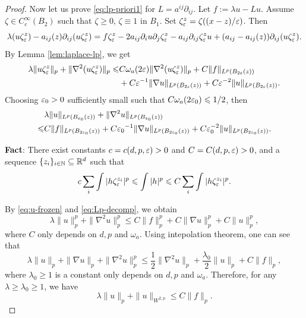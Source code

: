 \begin{proof}
    Now let us prove \eqref{eq:lp-priori1} for \(L=a^{ij}\partial_{ij}\). Let $f:=\lambda u-L u$. Assume $\zeta\in C_c^\infty(B_2)$ such that $\zeta\geq 0$, $\zeta\equiv1$ in $B_1$. Set $\zeta_\varepsilon^z=\zeta((x-z)/\varepsilon)$. Then
    \begin{equation*}
        \lambda (u\zeta_\varepsilon^z) - a_{ij}(z)\partial_{ij}(u\zeta_\varepsilon^z) =  f\zeta_\varepsilon^z-2a_{ij}\partial_i u\partial_{j}\zeta_\varepsilon^z -a_{ij}\partial_{ij}\zeta_\varepsilon^z u +(a_{ij}-a_{ij}(z)) \partial_{ij}(u\zeta_\varepsilon^z).
    \end{equation*}
    By Lemma \ref{lem:laplace-lp},  we get 
		\begin{equation*}
			\begin{aligned}
				\lambda \|u \zeta_\varepsilon^z\|_p+ \|\nabla^2(u\zeta_\varepsilon^z)\|_{p} \leqslant & C \omega_a(2\varepsilon) \|\nabla^2 (u\zeta_\varepsilon^z)\|_p+ C \|f\|_{L^p(B_{2\varepsilon}(z))}\\
				&+C \varepsilon^{-1} \|\nabla u \|_{L^p(B_{2\varepsilon}(z))}+ C\varepsilon^{-2} \|u\|_{L^p(B_{2\varepsilon}(z))}. 
			\end{aligned}
		\end{equation*}
		Choosing $\varepsilon_0>0$ sufficiently small such that $C\omega_a(2\varepsilon_0)\leqslant 1/2$, then 
		\begin{equation}\label{eq:u-frozen}
			\begin{aligned}
				&\lambda \|u\|_{L^p(B_{\varepsilon_0}(z))} + \|\nabla^2 u\|_{L^p(B_{\varepsilon_0}(z))} \\
				\leqslant& C \|f\|_{L^p(B_{2{\varepsilon_0}}(z))}+C {\varepsilon_0}^{-1} \|\nabla u \|_{L^p(B_{2{\varepsilon_0}}(z))}+ C\varepsilon_0^{-2} \|u\|_{L^p(B_{2{\varepsilon_0}}(z))}. 
			\end{aligned}
		\end{equation}
		\begin{framed}
		    {\bf Fact}: There exist constants $c=c(d,  p, \varepsilon)>0$ and $C=C(d,  p, \varepsilon)>0$, and a sequence $\{z_i \}_{i\in {\mathbb N}}\subseteq {\mathbb R}^d$ such that 
		    \begin{equation}\label{eq:Lp-decomp}
			    c \sum_{i} \int |h\zeta_\varepsilon^{z_i}|^p   \leqslant \int |h|^p \leqslant C \sum_{i} \int |h\zeta_\varepsilon^{z_i}|^p. 
		    \end{equation}
		\end{framed}
		By \eqref{eq:u-frozen} and \eqref{eq:Lp-decomp}, we obtain 
		\begin{equation*}
			\lambda \|u\|_{p}^p + \|\nabla^2 u\|_{p}^p 
			\leq C \|f\|_{p}^p+C \|\nabla u \|_{p}^p+ C \|u\|_{p}^p, 
		\end{equation*}
		where $C$ only depends on $d, p$ and $\omega_a$. Using intepolation theorem, one can see that 
		\[
		    \lambda \|u\|_{p} +\|\nabla u\|_p + \|\nabla^2 u\|_{p}^p \leq \frac{1}{2} \|\nabla^2 u\|_p+ \frac{\lambda_0}{2} \|u\|_{p} + C \|f\|_p, 
		\]
		where $\lambda_0\geq 1$ is a constant only depends on $d, p$ and $\omega_a$. Therefore, for any $\lambda \geq \lambda_0\geq 1$, we have 
		\[
		    \lambda \|u\|_p+\| u\|_{W^{2,p}} \leq C \|f\|_p. 
		\]
	\end{proof}
	
